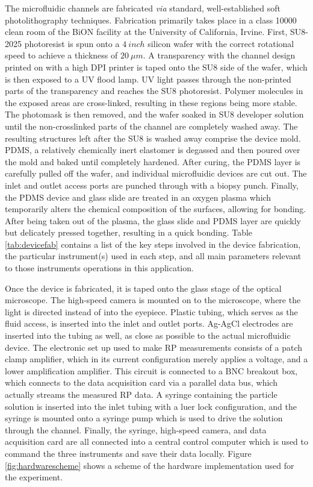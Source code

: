 			The microfluidic channels are fabricated \textit{via} standard, well-established soft photolithography techniques. Fabrication primarily takes place in a class 10000 clean room of the BiON facility at the University of California, Irvine. First, SU8-2025 photoresist is spun onto a $\SI{4}{inch}$ silicon wafer with the correct rotational speed to achieve a thickness of $\SI{20}{\mu m}$. A transparency with the channel design printed on with a high DPI printer is taped onto the SU8 side of the wafer, which is then exposed to a UV flood lamp. UV light passes through the non-printed parts of the transparency and reaches the SU8 photoresist. Polymer molecules in the exposed areas are cross-linked, resulting in these regions being more stable. The photomask is then removed, and the wafer soaked in SU8 developer solution until the non-crosslinked parts of the channel are completely washed away. The resulting structures left after the SU8 is washed away comprise the device mold. PDMS, a relatively chemically inert elastomer is degassed and then poured over the mold and baked until completely hardened. After curing, the PDMS layer is carefully pulled off the wafer, and individual microfluidic devices are cut out. The inlet and outlet access ports are punched through with a biopsy punch. Finally, the PDMS device and glass slide are treated in an oxygen plasma which temporarily alters the chemical composition of the surfaces, allowing for bonding. After being taken out of the plasma, the glass slide and PDMS layer are quickly but delicately pressed together, resulting in a quick bonding. Table \ref{tab:devicefab} contains a list of the key steps involved in the device fabrication, the particular instrument(s) used in each step, and all main parameters relevant to those instruments operations in this application.
			
			Once the device is fabricated, it is taped onto the glass stage of the optical microscope. The high-speed camera is mounted on to the microscope, where the light is directed instead of into the eyepiece. Plastic tubing, which serves as the fluid access, is inserted into the inlet and outlet ports. Ag-AgCl electrodes are inserted into the tubing as well, as close as possible to the actual microfluidic device. The electronic set up used to make RP measurements consists of a patch clamp amplifier, which in its current configuration merely applies a voltage, and a lower amplification amplifier. This circuit is connected to a BNC breakout box, which connects to the data acquisition card via a parallel data bus, which actually streams the measured RP data. A syringe containing the particle solution is inserted into the inlet tubing with a luer lock configuration, and the syringe is mounted onto a syringe pump which is used to drive the solution through the channel. Finally, the syringe, high-speed camera, and data acquisition card are all connected into a central control computer which is used to command the three instruments and save their data locally. Figure \ref{fig:hardwarescheme} shows a scheme of the hardware implementation used for the experiment.
			
